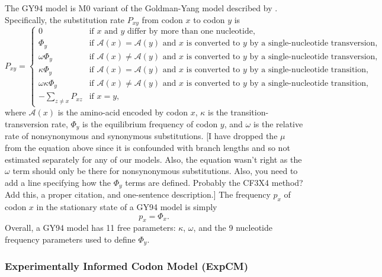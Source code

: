 \documentclass[11pt]{article}
\newcommand\jdbcomment[1]{{\color{red}[#1]}}
\begin{document}
The GY94 model is M0 variant of the Goldman-Yang model described by \citet{yang2000codon}. 
Specifically, the substitution rate $P_{xy}$ from codon $x$ to codon $y$ is 
\begin{equation}
\label{eq:GY94}
P_{xy} = 
\begin{cases}
  0 & \mbox{if $x$ and $y$ differ by more than one nucleotide,}\\
  \Phi_y & \mbox{if $\mathcal{A}\left(x\right) = \mathcal{A}\left(y\right)$ and $x$ is converted to $y$ by a single-nucleotide transversion,} \\
  \omega \Phi_{y} & \mbox{if $\mathcal{A}\left(x\right) \ne \mathcal{A}\left(y\right)$ and $x$ is converted to $y$ by a single-nucleotide transversion,} \\
  \kappa \Phi_y & \mbox{if $\mathcal{A}\left(x\right) = \mathcal{A}\left(y\right)$ and $x$ is converted to $y$ by a single-nucleotide transition,} \\
  \omega \kappa \Phi_{y} & \mbox{if $\mathcal{A}\left(x\right) \ne \mathcal{A}\left(y\right)$ and $x$ is converted to $y$ by a single-nucleotide transition,} \\
  -\sum\limits_{z \ne x} P_{xz} & \mbox{if $x = y$,}
  \end{cases}
\end{equation}
where $\mathcal{A}\left(x\right)$ is the amino-acid encoded by codon $x$, $\kappa$ is the transition-transversion rate, $\Phi_y$ is the equilibrium frequency of codon $y$, and $\omega$ is the relative rate of nonsynonymous and synonymous substitutions.
\jdbcomment{I have dropped the $\mu$ from the equation above since it is confounded with branch lengths and so not estimated separately for any of our models.
Also, the equation wasn't right as the $\omega$ term should only be there for nonsynonymous substitutions.
Also, you need to add a line specifying how the $\Phi_y$ terms are defined. Probably the CF3X4 method? Add this, a proper citation, and one-sentence description.}
The frequency $p_x$ of codon $x$ in the stationary state of a GY94 model is simply 
\begin{equation}
\label{eq:px}
p_{x} = \Phi_x.
\end{equation}
Overall, a GY94 model has 11 free parameters: $\kappa$, $\omega$, and the 9 nucleotide frequency parameters used to define $\Phi_y$. 

\subsubsection*{Experimentally Informed Codon Model (ExpCM)}
\end{document}
